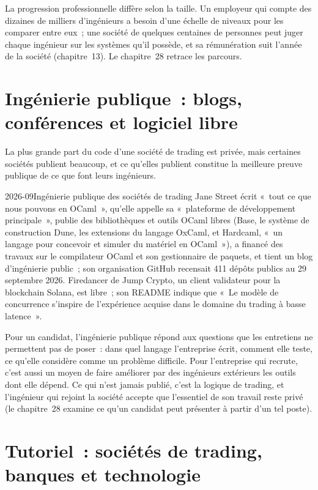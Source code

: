 La progression professionnelle diffère selon la taille. Un employeur qui compte des dizaines de milliers d'ingénieurs a besoin d'une échelle de niveaux pour les comparer
entre eux~; une société de quelques centaines de personnes peut juger chaque ingénieur sur les systèmes qu'il possède, et sa rémunération suit
l'année de la société (chapitre~13). Le chapitre~28 retrace les parcours.

\section{Ingénierie publique~: blogs, conférences et logiciel libre}

La plus grande part du code d'une société de trading est privée, mais certaines sociétés publient beaucoup, et ce qu'elles publient constitue la meilleure
preuve publique de ce que font leurs ingénieurs.

\begin{dated}{2026-09}{Ingénierie publique des sociétés de trading}\label{dat:in:software-engineer:public}
Jane Street écrit «~tout ce que nous pouvons en OCaml~», qu'elle appelle sa «~plateforme de développement principale~», publie
des bibliothèques et outils OCaml libres (Base, le système de construction Dune, les extensions du langage OxCaml, et Hardcaml, «~un
langage pour concevoir et simuler du matériel en OCaml~»), a financé des travaux sur le compilateur OCaml et son gestionnaire de paquets,
et tient un blog d'ingénierie public~; son organisation GitHub recensait 411 dépôts publics au 29 septembre 2026. Firedancer de Jump
Crypto, un client validateur pour la blockchain Solana, est libre~; son README indique que «~Le modèle de concurrence
s'inspire de l'expérience acquise dans le domaine du trading à basse latence~».
\end{dated}

Pour un candidat, l'ingénierie publique répond aux questions que les entretiens ne permettent pas de poser~: dans quel langage l'entreprise écrit, comment elle
teste, ce qu'elle considère comme un problème difficile. Pour l'entreprise qui recrute, c'est aussi un moyen de faire améliorer par des ingénieurs extérieurs les
outils dont elle dépend. Ce qui n'est jamais publié, c'est la logique de trading, et l'ingénieur qui rejoint la société accepte que l'essentiel de
son travail reste privé (le chapitre~28 examine ce qu'un candidat peut présenter à partir d'un tel poste).

\section{Tutoriel~: sociétés de trading, banques et technologie}\label{tut:in:software-engineer:tut}

